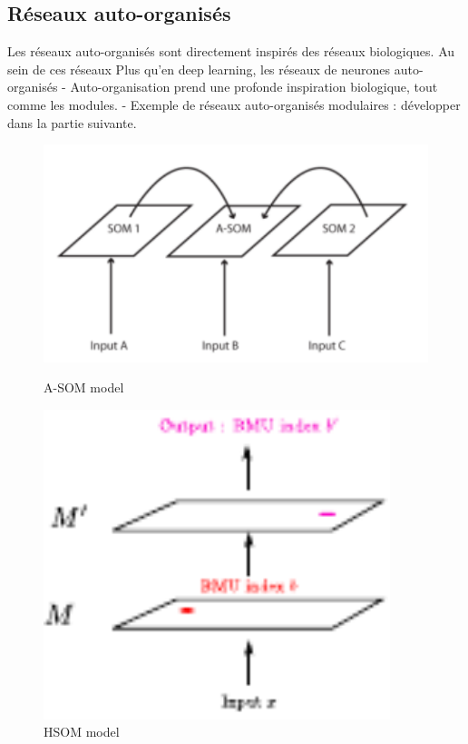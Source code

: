 \subsection{Réseaux auto-organisés}

Les réseaux auto-organisés sont directement inspirés des réseaux biologiques. Au sein de ces réseaux
Plus qu'en deep learning, les réseaux de neurones auto-organisés
- Auto-organisation prend une profonde inspiration biologique, tout comme les modules.
- Exemple de réseaux auto-organisés modulaires : développer dans la partie suivante.
\begin{figure}
\begin{minipage}{0.5\textwidth}

\includegraphics[width=\textwidth]{asom}
\caption{A-SOM model \cite{johnsson_associative_2009}}
\end{minipage}
\begin{minipage}{0.5\textwidth}
\includegraphics[width=0.9\textwidth]{hsom}
\caption{HSOM model \cite{LampinenClusteringPO}}

\end{minipage}
\end{figure}
\cite{LampinenClusteringPO}

